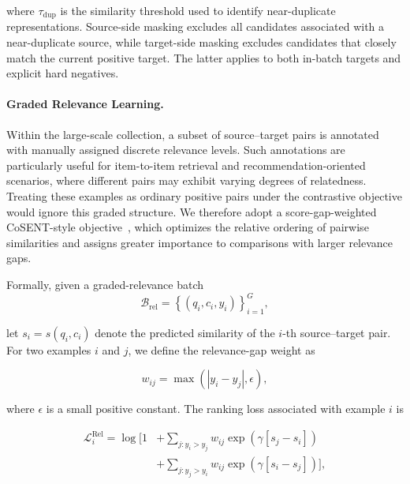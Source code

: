 \documentclass[]{wechat}
\begin{document}
where $\tau_{\mathrm{dup}}$ is the similarity threshold used to identify near-duplicate representations. Source-side masking excludes all candidates associated with a near-duplicate source, while target-side masking excludes candidates that closely match the current positive target. The latter applies to both in-batch targets and explicit hard negatives.

\paragraph{Graded Relevance Learning.}

Within the large-scale collection, a subset of source--target pairs is annotated with manually assigned discrete relevance levels. Such annotations are particularly useful for item-to-item retrieval and recommendation-oriented scenarios, where different pairs may exhibit varying degrees of relatedness. Treating these examples as ordinary positive pairs under the contrastive objective would ignore this graded structure. We therefore adopt a score-gap-weighted CoSENT-style objective~\citep{cosent}, which optimizes the relative ordering of pairwise similarities and assigns greater importance to comparisons with larger relevance gaps. 





Formally, given a graded-relevance batch
\begin{equation}
    \mathcal{B}_{\mathrm{rel}}
    =
    \left\{
        (q_i,c_i,y_i)
    \right\}_{i=1}^{G},
    \label{eq:relevance_batch}
\end{equation}

let $s_i=s(q_i,c_i)$ denote the predicted similarity of the $i$-th source--target pair. For two examples $i$ and $j$, we define the relevance-gap weight as

\begin{equation}
    w_{ij}
    =
    \max
    \left(
        \left|y_i-y_j\right|,
        \epsilon
    \right),
    \label{eq:relevance_gap_weight}
\end{equation}

where $\epsilon$ is a small positive constant. The ranking loss associated with example $i$ is

\begin{align}
    \mathcal{L}_{i}^{\mathrm{Rel}}
    =
    \log
    \Bigg[
        1
        &+
        \sum_{j:y_i>y_j}
        w_{ij}
        \exp
        \left(
            \gamma
            \left[
                s_j-s_i
            \right]
        \right)
        \nonumber\\
        &+
        \sum_{j:y_j>y_i}
        w_{ij}
        \exp
        \left(
            \gamma
            \left[
                s_i-s_j
            \right]
        \right)
    \Bigg],
    \label{eq:relevance_anchor_loss}
\end{align}
\end{document}
